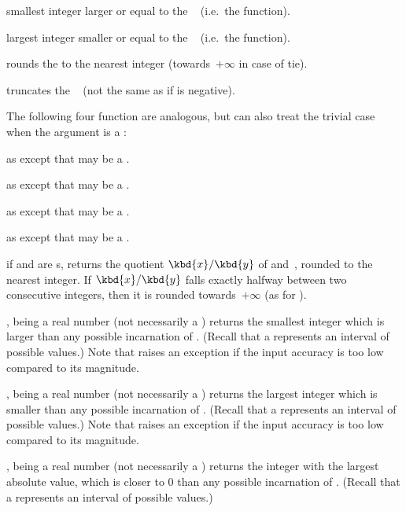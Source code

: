  smallest integer larger or equal
to the ~ (i.e.~the  function).

 largest integer smaller or equal to the
~ (i.e.~the  function).

 rounds the   to the nearest integer
(towards~$+\infty$ in case of tie).

 truncates the ~ (not the same as
 if  is negative).

The following four function are analogous, but can also treat the trivial
case when the argument is a :

as  except that  may be a .

as  except that  may be a .

as  except that  may be a .

as  except that  may be a .

 if  and  are s,
returns the quotient $\kbd{x}/\kbd{y}$ of  and~, rounded to
the nearest integer. If $\kbd{x}/\kbd{y}$ falls exactly halfway between
two consecutive integers, then it is rounded towards~$+\infty$ (as for
).

,  being a real number (not necessarily a
) returns the smallest integer which is larger than any possible
incarnation of . (Recall that a  represents an interval of
possible values.) Note that  raises an exception if the input
accuracy is too low compared to its magnitude.

,  being a real number (not necessarily a
) returns the largest integer which is smaller than any possible
incarnation of . (Recall that a  represents an interval of
possible values.) Note that  raises an exception if the input
accuracy is too low compared to its magnitude.

,  being a real number (not necessarily a
) returns the integer with the largest absolute value, which is closer
to $0$ than any possible incarnation of . (Recall that a 
represents an interval of possible values.)

